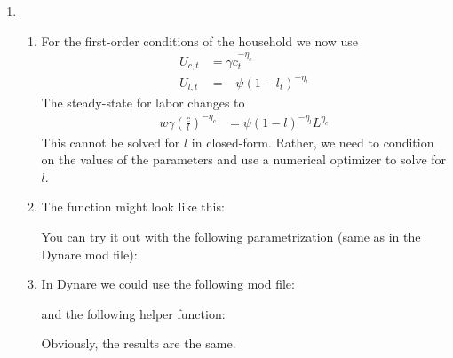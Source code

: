 \begin{enumerate}
\item

\begin{enumerate}

\item For the first-order conditions of the household we now use
\begin{align*}
U_{c,t} &= \gamma c_t^{-\eta_c}
\\
U_{l,t} &= - \psi {\left(1-l_t\right)}^{-\eta_l}
\end{align*}
The steady-state for labor changes to
\begin{align*}
w \gamma {\left(\frac{c}{l}\right)}^{-\eta_c} &= \psi{(1-l)}^{-\eta_l}L^{\eta_c}
\end{align*}
This cannot be solved for \(l\) in closed-form.
Rather, we need to condition on the values of the parameters and use a numerical optimizer to solve for \(l\).

\item The function might look like this:

You can try it out with the following parametrization (same as in the Dynare mod file):


\item In Dynare we could use the following mod file:

and the following helper function:

Obviously, the results are the same.

\end{enumerate}

\end{enumerate}